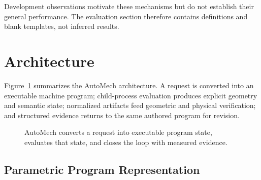 \documentclass[10pt]{article}
\begin{document}
Development observations motivate these mechanisms but do not establish their general
performance. The evaluation section therefore contains definitions and blank templates,
not inferred results.

\section{Architecture}

Figure~\ref{fig:architecture} summarizes the AutoMech architecture. A request is converted
into an executable machine program; child-process evaluation produces explicit geometry
and semantic state; normalized artifacts feed geometric and physical verification; and
structured evidence returns to the same authored program for revision.

\begin{figure}[ht]
\centering
{}
\caption{AutoMech converts a request into executable program state, evaluates that state,
and closes the loop with measured evidence.}
\label{fig:architecture}
\end{figure}

\subsection{Parametric Program Representation}
\end{document}
